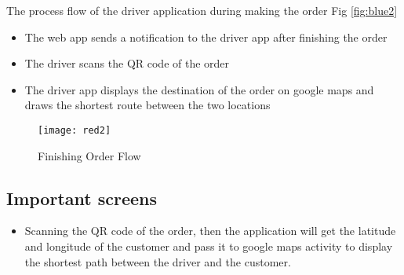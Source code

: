 The process flow of the driver application during making the order Fig \ref{fig:blue2}
\begin{itemize}
    \item The web app sends a notification to the driver app after finishing the order
    \item The driver scans the QR code of the order
    \item The driver app displays the destination of the order on google maps and draws the shortest
    route between the two locations
    
\end{itemize}

\begin{figure}[h]
    \texttt{[image: red2]}
    \centering
    \caption{Finishing Order Flow}
    \label{fig:red2}
\end{figure}



\subsection{Important screens}
\begin{itemize}
    \item Scanning the QR code of the order, then the application will get the latitude and longitude of
    the customer and pass it to google maps activity to display the shortest path between the
    driver and the customer.
\end{itemize}